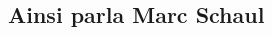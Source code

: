 \documentclass{article}
\begin{document}
\begin{multicols*}{2}
\part*{Ainsi parla Marc Schaul}
\tableofcontents
\vfill\null
\columnbreak





\pagebreak

\end{multicols*}
\end{document}
